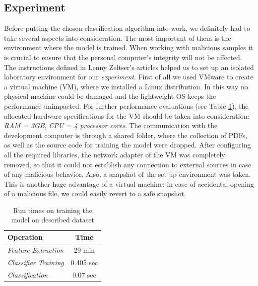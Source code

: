 \subsection{Experiment}
Before putting the chosen classification algorithm into work, we definitely had to take several aspects into consideration. The most important of them is the environment where the model is trained. When working with malicious samples it is crucial to ensure that the personal computer's integrity will not be affected. The instructions defined in Lenny Zeltser's articles \cite{zeltser} helped us to set up an isolated laboratory environment for our \textit{experiment}. First of all we used VMware to create a virtual machine (VM), where we installed a Linux distribution. In this way no physical machine could be damaged and the lightweight OS keeps the performance unimpacted. For further performance evaluations (see Table \ref{table:performance}), the allocated hardware specifications for the VM should be taken into consideration: \textit{RAM = 3GB}, \textit{CPU = 4 processor cores}. The communication with the development computer is through a shared folder, where the collection of PDFs, as well as the source code for training the model were dropped. After configuring all the required libraries, the network adapter of the VM was completely removed, so that it could not establish any connection to external sources in case of any malicious behavior. Also, a snapshot of the set up environment was taken. This is another huge advantage of a virtual machine: in case of accidental opening of a malicious file, we could easily revert to a safe snapshot. \par 

\begin{table}[H]
	\caption{Run times on training the model on described dataset}
	\label{table:performance}
        \centering
            \begin{tabular}{p{5cm} c}
                \toprule
                
				\textbf{Operation} & \textbf{Time} \\
				\hline 
				\textit{Feature Extraction} & 29 min \\
				\hline 
				\textit{Classifier Training} & 0.405 sec \\
				\hline
				\textit{Classification} & 0.07 sec \\

                \bottomrule
			\end{tabular}
\end{table}

